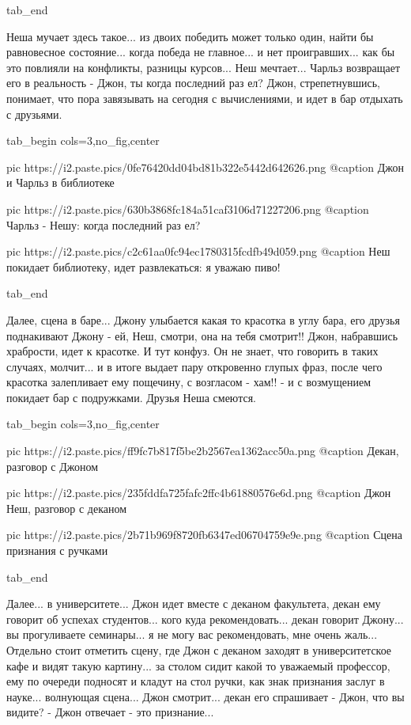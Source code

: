   tab_end
\fi

Неша мучает здесь такое... из двоих победить может только один, найти бы равновесное состояние...
когда победа не главное... и нет проигравших... как бы это повлияли на конфликты, разницы курсов...
Неш мечтает... Чарльз возвращает его в реальность - Джон, ты когда последний раз ел?
Джон, стрепетнувшись, понимает, что пора завязывать на сегодня с вычислениями, и идет в бар
отдыхать с друзьями.

\ifcmt
  tab_begin cols=3,no_fig,center

     pic https://i2.paste.pics/0fe76420dd04bd81b322e5442d642626.png
		 @caption Джон и Чарльз в библиотеке

		 pic https://i2.paste.pics/630b3868fc184a51caf3106d71227206.png
		 @caption Чарльз - Нешу: когда последний раз ел?

		 pic https://i2.paste.pics/c2c61aa0fc94ec1780315fcdfb49d059.png
		 @caption Неш покидает библиотеку, идет развлекаться: я уважаю пиво!

  tab_end
\fi

Далее, сцена в баре... Джону улыбается какая то красотка в углу бара, его
друзья поднакивают Джону - ей, Неш, смотри, она на тебя смотрит!! Джон,
набравшись храбрости, идет к красотке. И тут конфуз.  Он не знает, что говорить
в таких случаях, молчит... и в итоге выдает пару откровенно глупых фраз, после
чего красотка залепливает ему пощечину, с возгласом - хам!! - и с возмущением
покидает бар с подружками.  Друзья Неша смеются.

\ifcmt
  tab_begin cols=3,no_fig,center

     pic https://i2.paste.pics/ff9fc7b817f5be2b2567ea1362acc50a.png
		 @caption Декан, разговор с Джоном

		 pic https://i2.paste.pics/235fddfa725fafc2ffc4b61880576e6d.png
		 @caption Джон Неш, разговор с деканом

		 pic https://i2.paste.pics/2b71b969f8720fb6347ed06704759e9e.png
		 @caption Сцена признания с ручками

  tab_end
\fi

Далее... в университете... Джон идет вместе с деканом факультета, декан ему
говорит об успехах студентов... кого куда рекомендовать...  декан говорит
Джону... вы прогуливаете семинары... я не могу вас рекомендовать, мне очень
жаль... Отдельно стоит отметить сцену, где Джон с деканом заходят в
университетское кафе и видят такую картину... за столом сидит какой то
уважаемый профессор, ему по очереди подносят и кладут на стол ручки, как знак
признания заслуг в науке... волнующая сцена...  Джон смотрит... декан его
спрашивает - Джон, что вы видите? - Джон отвечает - это признание...

